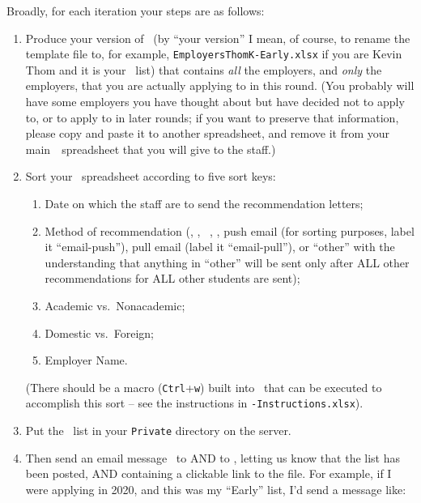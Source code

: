 \documentclass{\econtex}
\newcommand\redout{\bgroup\markoverwith
  {\textcolor{red}{\rule[.5ex]{2pt}{1pt}}}\ULon}
\begin{document}
Broadly, for each iteration your steps are as follows:
\begin{enumerate}
\item Produce your version of \EMtt~(by ``your version'' I mean, of
  course, to rename the template file to, for example,
  \texttt{EmployersThomK-Early.xlsx} if you are Kevin Thom and it is
  your \Early~list) that contains \textit{all} the employers, and \textit{    only} the employers, that you are actually applying to in this
  round.  (You probably will have some employers you have thought
  about but have decided not to apply to, or to apply to in later rounds; if you want to preserve that
  information, please copy and paste it to another spreadsheet, and
  remove it from your main~{\EMW}~spreadsheet that you will give to the
  staff.)

\item Sort your \EMtt~spreadsheet according to five sort keys:
  \begin{enumerate} 
  \item Date on which the staff are to send the recommendation letters; 
  \item Method of recommendation (\AEA, \AJO, {\EJM}~, \Interfolio, push email (for sorting purposes,
    label it ``email-push''), pull email (label it ``email-pull''), or
    ``other'' with the understanding that anything in ``other'' will be
    sent only after ALL other recommendations for ALL other students are
    sent);
  \item Academic vs.\ Nonacademic;
  \item Domestic vs.\ Foreign;
  \item Employer Name. 
  \end{enumerate} 

  (There should be a macro (\texttt{Ctrl}+\texttt{w}) built into \EMtt~that can be
  executed to accomplish this sort -- see the instructions in
  \EMtt\texttt{-Instructions.xlsx}).

\item Put the {\EMtt}~list in your \texttt{Private} directory on the server.
  
\item Then send an email message \EMtt~to \jmstaffemail AND to \JMPOEmail, letting us know that the list has been posted, AND containing a clickable link to the file.  For example, if I were applying in 2020, and this was my ``Early'' list, I'd send a message like:


\end{enumerate}
\end{document}

